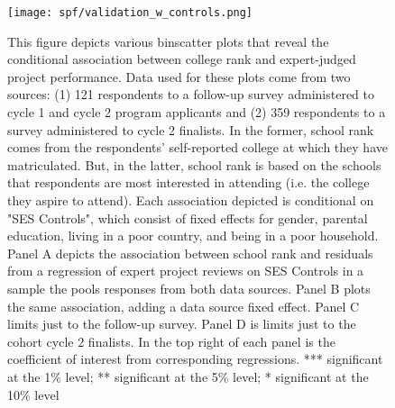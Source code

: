    \newpage
    \begin{figure}[!htb]
    \centering
        \caption{This figure depicts various binscatter plots that reveal the conditional association between college rank and expert-judged project performance. Data used for these plots come from two sources: (1) 121 respondents to a follow-up survey administered to cycle 1 and cycle 2 program applicants and (2) 359 respondents to a survey administered to cycle 2 finalists. In the former, school rank comes from the respondents' self-reported college at which they have matriculated. But, in the latter, school rank is based on the schools that respondents are most interested in attending (i.e. the college they aspire to attend). Each association depicted is conditional on "SES Controls", which consist of fixed effects for gender, parental education, living in a poor country, and being in a poor household. Panel A depicts the association between school rank and residuals from a regression of expert project reviews on SES Controls in a sample the pools responses from both data sources. Panel B plots the same association, adding a data source fixed effect. Panel C limits just to the follow-up survey. Panel D is limits just to the cohort cycle 2 finalists. In the top right of each panel is the coefficient of interest from corresponding regressions. *** significant at the 1\% level; ** significant at the 5\% level; * significant at the 10\% level} \label{fig:proj_robust_2}
    \texttt{[image: spf/validation\_w\_controls.png]} 
    \end{figure}
    
